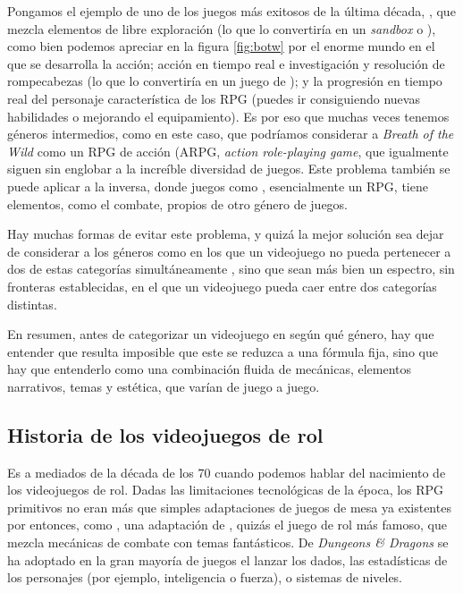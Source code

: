 Pongamos el ejemplo de uno de los juegos más exitosos de la última década, , que mezcla elementos de libre exploración (lo que lo convertiría en un \textit{sandbox} o ), como bien podemos apreciar en la figura \ref{fig:botw} por el enorme mundo en el que se desarrolla la acción; acción en tiempo real e investigación y resolución de rompecabezas (lo que lo convertiría en un juego de ); y la progresión en tiempo real del personaje característica de los RPG (puedes ir consiguiendo nuevas habilidades o mejorando el equipamiento). Es por eso que muchas veces tenemos géneros intermedios, como en este caso, que podríamos considerar a \textit{Breath of the Wild} como un RPG de acción (ARPG, \textit{action role-playing game}, que igualmente siguen sin englobar a la increíble diversidad de juegos. Este problema también se puede aplicar a la inversa, donde juegos como , esencialmente un RPG, tiene elementos, como el combate, propios de otro género de juegos.

\smallskip

Hay muchas formas de evitar este problema, y quizá la mejor solución sea dejar de considerar a los géneros como  en los que un videojuego no pueda pertenecer a dos de estas categorías simultáneamente \citep{Apperley}, sino que sean más bien un espectro, sin fronteras establecidas, en el que un videojuego pueda caer entre dos categorías distintas.

\medskip

En resumen, antes de categorizar un videojuego en según qué género, hay que entender que resulta imposible que este se reduzca a una fórmula fija, sino que hay que entenderlo como una combinación fluida de mecánicas, elementos narrativos, temas y estética, que varían de juego a juego.

\subsection{Historia de los videojuegos de rol}


Es a mediados de la década de los 70 cuando podemos hablar del nacimiento de los videojuegos de rol. Dadas las limitaciones tecnológicas de la época, los RPG primitivos no eran más que simples adaptaciones de juegos de mesa ya existentes por entonces, como , una adaptación de , quizás el juego de rol más famoso, que mezcla mecánicas de combate con temas fantásticos. De \textit{Dungeons \& Dragons} se ha adoptado en la gran mayoría de juegos el lanzar los dados, las estadísticas de los personajes (por ejemplo, inteligencia o fuerza), o sistemas de niveles. 

